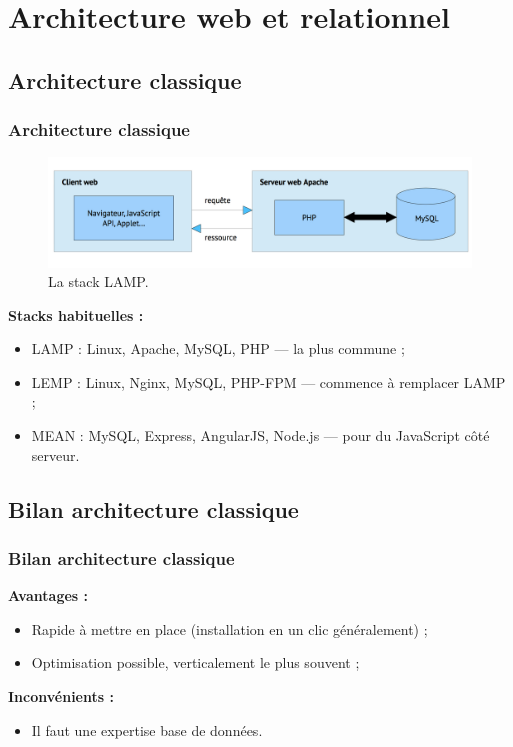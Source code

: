 \section{Architecture web et relationnel}

	\subsection{Architecture classique}
	\begin{frame}
		\frametitle{Architecture classique}

		\begin{figure}[htb]
			\includegraphics[width=1\textwidth]{images/LAMP.png}
			\caption{La stack LAMP.}
		\end{figure}

		\textbf{Stacks habituelles :}
		\begin{itemize}
			\item LAMP : Linux, Apache, MySQL, PHP — la plus commune ;
			\item LEMP : Linux, Nginx, MySQL, PHP-FPM — commence à remplacer LAMP ;
			\item MEAN : MySQL, Express, AngularJS, Node.js — pour du JavaScript côté serveur.
		\end{itemize}
	\end{frame}

	\subsection{Bilan architecture classique}
	\begin{frame}
		\frametitle{Bilan architecture classique}

		\textbf{Avantages :}
		\begin{itemize}
			\item Rapide à mettre en place (installation en un clic généralement) ;
			\item Optimisation possible, verticalement le plus souvent ;
		\end{itemize}

		\vspace{20px}

		\textbf{Inconvénients :}
		\begin{itemize}
			\item Il faut une expertise base de données.
		\end{itemize}
	\end{frame}

